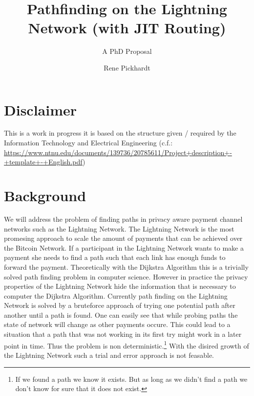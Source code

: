 \documentclass[a4paper]{paper}
\title{Pathfinding on the Lightning Network (with JIT Routing)}
\subtitle{A PhD Proposal}
\author{Rene Pickhardt}
\begin{document}
 
\section{Disclaimer}
This is a work in progress it is based on the structure given / required by the Information Technology and Electrical Engineering (c.f.: \url{https://www.ntnu.edu/documents/139736/20785611/Project+description+-+template+-+English.pdf})

\section{Background}
We will address the problem of finding paths in privacy aware payment channel networks such as the Lightning Network.
The Lightning Network is the most promesing approach to scale the amount of payments that can be achieved over the Bitcoin Network.
If a participant in the Lightning Network wants to make a payment she needs to find a path such that each link has enough funds to forward the payment.
Theoretically with the Dijkstra Algorithm this is a trivially solved path finding problem in computer science.
However in practice the privacy properties of the Lightning Network hide the information that is necessary to computer the Dijkstra Algorithm.
Currently path finding on the Lightning Network is solved by a bruteforce approach of trying one potential path after another until a path is found.
One can easily see that while probing paths the state of network will change as other payments occure.
This could lead to a situation that a path that was not working in its first try might work in a later point in time.
Thus the problem is non deterministic.\footnote{If we found a path we know it exists. But as long as we didn't find a path we don't know for sure that it does not exist.}
With the disired growth of the Lightning Network such a trial and error approach is not feasable.
\end{document}
